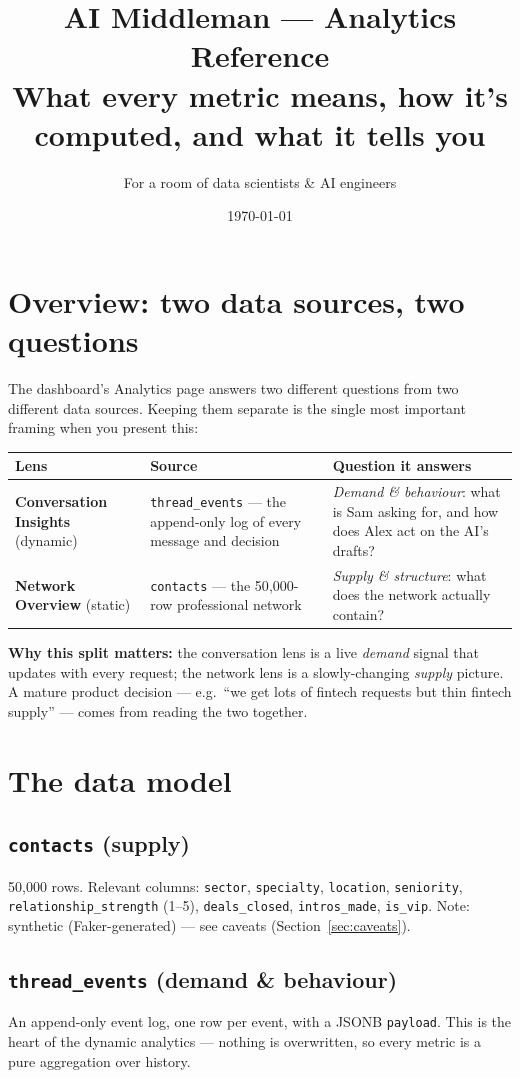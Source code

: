 \documentclass[11pt, a4paper]{article}
\title{\textbf{AI Middleman --- Analytics Reference} \\ \large What every metric means, how it's computed, and what it tells you}
\author{For a room of data scientists \& AI engineers}
\date{\today}
\begin{document}
\maketitle
\thispagestyle{fancy}

\section{Overview: two data sources, two questions}

The dashboard's Analytics page answers two different questions from two different data sources. Keeping them separate is the single most important framing when you present this:

\begin{longtable}{@{}p{3.2cm}p{5.5cm}p{6.3cm}@{}}
\toprule
Lens & Source & Question it answers \\
\midrule
\endhead
\textbf{Conversation Insights} (dynamic) & \texttt{thread\_events} --- the append-only log of every message and decision & \emph{Demand \& behaviour}: what is Sam asking for, and how does Alex act on the AI's drafts? \\
\textbf{Network Overview} (static) & \texttt{contacts} --- the 50{,}000-row professional network & \emph{Supply \& structure}: what does the network actually contain? \\
\bottomrule
\end{longtable}

\textbf{Why this split matters:} the conversation lens is a live \emph{demand} signal that updates with every request; the network lens is a slowly-changing \emph{supply} picture. A mature product decision --- e.g.\ ``we get lots of fintech requests but thin fintech supply'' --- comes from reading the two together.

\section{The data model}

\subsection{\texttt{contacts} (supply)}
50{,}000 rows. Relevant columns: \texttt{sector}, \texttt{specialty}, \texttt{location}, \texttt{seniority}, \texttt{relationship\_strength} (1--5), \texttt{deals\_closed}, \texttt{intros\_made}, \texttt{is\_vip}. Note: synthetic (Faker-generated) --- see caveats (Section~\ref{sec:caveats}).

\subsection{\texttt{thread\_events} (demand \& behaviour)}
An append-only event log, one row per event, with a JSONB \texttt{payload}. This is the heart of the dynamic analytics --- nothing is overwritten, so every metric is a pure aggregation over history.
\end{document}
